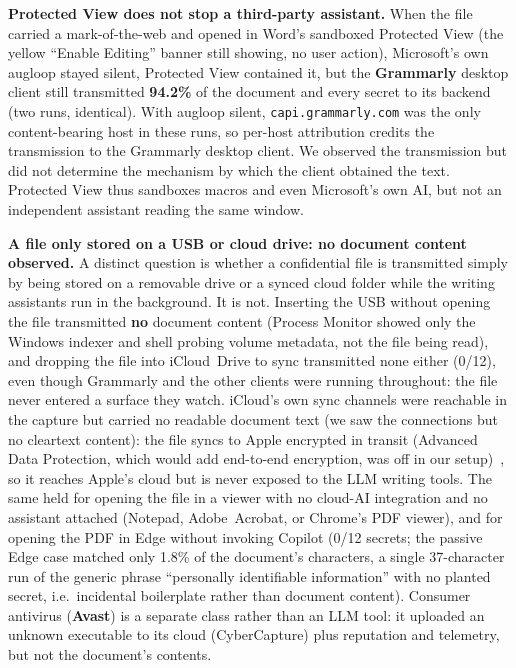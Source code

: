 \documentclass[sigconf,anonymous,review,balance=false]{acmart}
\begin{document}
\textbf{Protected View does not stop a third-party assistant.} When the file carried a
mark-of-the-web and opened in Word's sandboxed Protected View (the yellow ``Enable
Editing'' banner still showing, no user action), Microsoft's own augloop stayed silent,
Protected View contained it, but the \textbf{Grammarly} desktop client still transmitted
\textbf{94.2\%} of the document and every secret to its backend (two runs, identical). With
augloop silent, \texttt{capi.grammarly.com} was the only content-bearing host in these
runs, so per-host attribution credits the transmission to the Grammarly desktop client. We
observed the transmission but did not determine the mechanism by which the client obtained
the text. Protected View thus sandboxes macros and even Microsoft's own AI, but not an
independent assistant reading the same window.

\textbf{A file only stored on a USB or cloud drive: no document content observed.} A
distinct question is whether a confidential file is transmitted simply by being stored on a
removable drive or a synced cloud folder while the writing assistants run in the
background. It is not. Inserting the USB without opening the file transmitted \textbf{no} document content
(Process Monitor showed only the Windows indexer and shell probing volume metadata, not the
file being read), and dropping the file into iCloud~Drive to sync transmitted none either
(0/12), even though Grammarly and the other clients were running throughout: the file never
entered a surface they watch. iCloud's own sync channels were reachable in the capture but carried no readable document
text (we saw the connections but no cleartext content): the file syncs to Apple encrypted in
transit (Advanced Data Protection, which would add end-to-end encryption, was off in our
setup)~\citep{apple2024platformsec}, so it reaches Apple's cloud but is never exposed to the
LLM writing tools. The same held for opening the file in a viewer with no cloud-AI
integration and no assistant attached (Notepad, Adobe~Acrobat, or Chrome's PDF viewer), and for opening the PDF in Edge
without invoking Copilot (0/12 secrets; the passive Edge case matched only 1.8\% of the
document's characters, a single 37-character run of the generic phrase ``personally
identifiable information'' with no planted secret, i.e.\ incidental boilerplate rather than
document content).
Consumer antivirus (\textbf{Avast}) is a separate class rather than an LLM tool: it
uploaded an unknown executable to its cloud (CyberCapture) plus reputation and
telemetry, but not the document's contents.
\end{document}

